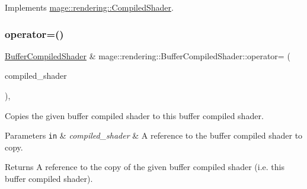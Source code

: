 Implements \mbox{\hyperlink{classmage_1_1rendering_1_1_compiled_shader_a8e574ddc7247689426cc15c6c6d416f8}{mage\+::rendering\+::\+Compiled\+Shader}}.

\mbox{\label{classmage_1_1rendering_1_1_buffer_compiled_shader_a1f8eb13198c5bad8ebe55ae1ddf94769}} 
\subsubsection{\texorpdfstring{operator=()}{operator=()}\hspace{0.1cm}{\footnotesize\ttfamily [1/2]}}
{\footnotesize\ttfamily \mbox{\hyperlink{classmage_1_1rendering_1_1_buffer_compiled_shader}{Buffer\+Compiled\+Shader}} \& mage\+::rendering\+::\+Buffer\+Compiled\+Shader\+::operator= (\begin{DoxyParamCaption}\item[{const \mbox{\hyperlink{classmage_1_1rendering_1_1_buffer_compiled_shader}{Buffer\+Compiled\+Shader}} \&}]{compiled\+\_\+shader }\end{DoxyParamCaption})\hspace{0.3cm}{\ttfamily [default]}, {\ttfamily [noexcept]}}

Copies the given buffer compiled shader to this buffer compiled shader.


\begin{DoxyParams}[1]{Parameters}
\mbox{\tt in}  & {\em compiled\+\_\+shader} & A reference to the buffer compiled shader to copy. \\
\hline
\end{DoxyParams}
\begin{DoxyReturn}{Returns}
A reference to the copy of the given buffer compiled shader (i.\+e. this buffer compiled shader). 
\end{DoxyReturn}
\mbox{\label{classmage_1_1rendering_1_1_buffer_compiled_shader_a0e11565292a427dff5b36ef7c26b6d08}} 
